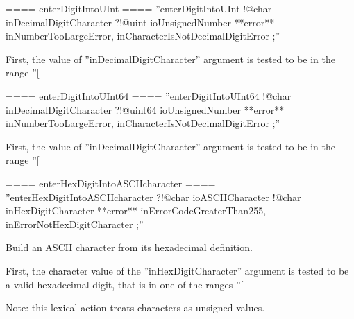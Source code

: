 {==== enterDigitIntoUInt ====
''enterDigitIntoUInt !@char inDecimalDigitCharacter ?!@uint ioUnsignedNumber **error** inNumberTooLargeError, inCharacterIsNotDecimalDigitError ;''

First, the value of ''inDecimalDigitCharacter'' argument is tested to be in the range ''[%

==== enterDigitIntoUInt64 ====
''enterDigitIntoUInt64 !@char inDecimalDigitCharacter ?!@uint64 ioUnsignedNumber **error** inNumberTooLargeError, inCharacterIsNotDecimalDigitError ;''

First, the value of ''inDecimalDigitCharacter'' argument is tested to be in the range ''[%

==== enterHexDigitIntoASCIIcharacter ====
''enterHexDigitIntoASCIIcharacter ?!@char ioASCIICharacter !@char inHexDigitCharacter **error** inErrorCodeGreaterThan255, inErrorNotHexDigitCharacter ;''

Build an ASCII character from its hexadecimal definition.

First, the character value of the ''inHexDigitCharacter'' argument is tested to be a valid hexadecimal digit, that is in one of the ranges ''[%

Note: this lexical action treats characters as unsigned values.

}
